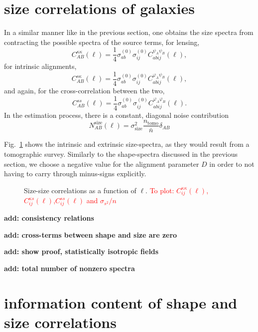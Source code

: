 \documentclass[a4paper,fleqn,usenatbib]{mnras}
\def\spirou#1{{\bf #1}}
\newcommand\BG[1]{\textcolor{red}{#1}}
\begin{document}
\section{size correlations of galaxies}\label{sect_sizes}
In a similar manner like in the previous section, one obtains the size spectra from contracting the possible spectra of the source terms, for lensing,
\begin{equation}
C^{\kappa\kappa}_{AB}(\ell) = \frac{1}{4}\sigma^{(0)}_{ab}\sigma^{(0)}_{ij}C^{\psi_A\psi_B}_{abij}(\ell),
\end{equation}
for intrinsic alignments,
\begin{equation}
C^{s\kappa}_{AB}(\ell) = \frac{1}{4}\sigma^{(0)}_{ab}\sigma^{(0)}_{ij}C^{\varphi_A\psi_B}_{abij}(\ell),
\end{equation}
and again, for the cross-correlation between the two,
\begin{equation}
C^{ss}_{AB}(\ell) = \frac{1}{4}\sigma^{(0)}_{ab}\sigma^{(0)}_{ij}C^{\varphi_A\varphi_B}_{abij}(\ell).
\end{equation}
In the estimation process, there is a constant, diagonal noise contribution
\begin{equation}
N_{AB}^\mathrm{size}(\ell) = \sigma^2_\mathrm{size} \frac{n_\mathrm{tomo}}{\bar{n}}\delta_{AB}
\end{equation}


Fig.~\ref{fig:shapeshape} shows the intrinsic and extrinsic size-spectra, as they would result from a tomographic survey. Similarly to the shape-spectra discussed in the previous section, we choose a negative value for the alignment parameter $D$ in order to not having to carry through minus-signs explicitly.


\begin{figure}
\centering
\caption{Size-size correlations as a function of $\ell$. \BG{To plot: $C_{ij}^{\kappa\kappa}(\ell)$,$C_{ij}^{\kappa s}(\ell)$,$C_{ij}^{ss}(\ell)$ and $\sigma_{s^2}/n$}}
\label{fig:shapeshape}
\end{figure}


\spirou{add: consistency relations}

\spirou{add: cross-terms between shape and size are zero}

\spirou{add: show proof, statistically isotropic fields}

\spirou{add: total number of nonzero spectra}


\section{information content of shape and size correlations}\label{sect_fisher}
\end{document}
